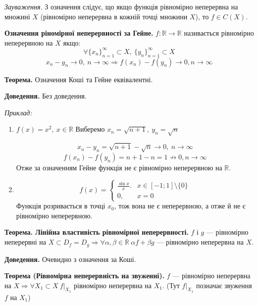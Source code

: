 \documentclass[12pt]{report}
\begin{document}
\vspace{3mm}

\textit{Зауваження.} З означення слідує, що якщо функція рівномірно неперервна на множині $X$ (рівномірно неперервна в кожній точці множини $X$), то $f \in C(X)$.

\vspace{5mm}

\textbf{Означення ріномірної неперервності за Гейне.} $f : \mathbb{R} \to \mathbb{R}$ називається рівномірно неперервною на $X$ якщо:
$$\forall \{x_n\}_{n=1}^{\infty} \subset X,\ \{y_n\}_{n=1}^{\infty} \subset X$$
$$x_n  - y_n \to 0,\ n \to \infty \Longrightarrow f(x_n) - f(y_n) \to 0, n \to \infty$$

\vspace{5mm}

\textbf{Теорема.} Означення Коші та Гейне еквівалентні.

\textbf{Доведення.} Без доведення.

\textit{Приклад:}

\begin{enumerate}
	\item $f(x) = x^2,\ x\in \mathbb{R}$
		Виберемо $x_n = \sqrt{n+1},\ y_n = \sqrt{n}$

		$$x_n - y_n = \sqrt{n+1} - \sqrt{n} \to 0,\ n\to \infty$$
		$$f(x_n) - f(y_n) = n+1 - n = 1 \not\to 0, n\to \infty$$
		Отже за означенням Гейне функція не є рівномірно неперервною на $\mathbb{R}.$
	\item $$f(x) = \begin{cases} \frac{\sin x}{x}. & x \in [-1; 1] \setminus \{0\}\\
						   0, & x = 0\end{cases}$$
		Функція розривається в точці $x_0$, тож вона не є неперервною, а отже й не є рівномірно неперервною.
\end{enumerate}	

\vspace{3mm}

\textbf{Теорема. Лінійна властивість рівномірної неперервності.} $f$ і $g$ --- рівномірно неперервні на $X \subset D_f = D_g \Longrightarrow \forall \alpha, \beta \in \mathbb{R}\ \alpha f + \beta g$ --- рівномірно неперервна на $X$.

\textbf{Доведення.} Очевидно з означення за Коші.

\vspace{5mm}

\textbf{Теорема (Рівномірна неперервність на звуженні).} $f$ --- рівномірно неперервна на $X \Longrightarrow \forall X_1 \subset X\ f | _{X_1}$ рівномірно неперервна на $X_1$. (Тут  $f | _{X_1}$ позначає звуження $f$ на $X_1$)
\end{document}
